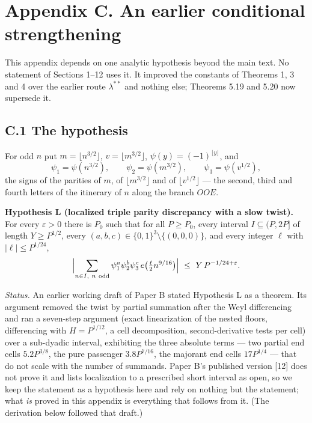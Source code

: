 \documentclass[11pt,a4paper]{article}
\begin{document}
\section{Appendix C. An earlier conditional
strengthening}\label{appendix-c.-an-earlier-conditional-strengthening}

This appendix depends on one analytic hypothesis beyond the main text.
No statement of Sections 1--12 uses it. It improved the constants of
Theorems 1, 3 and 4 over the earlier route \(\lambda^{**}\) and nothing
else; Theorems 5.19 and 5.20 now supersede it.

\subsection{C.1 The hypothesis}\label{c.1-the-hypothesis}

For odd \(n\) put \(m=\lfloor n^{3/2}\rfloor\),
\(v=\lfloor m^{3/2}\rfloor\), \(\psi(y)=(-1)^{\lfloor y\rfloor}\), and
\[
\psi_1=\psi(n^{3/2}),\qquad\psi_2=\psi(m^{3/2}),\qquad\psi_3=\psi(v^{1/2}),
\] the signs of the parities of \(m\), of \(\lfloor m^{3/2}\rfloor\) and
of \(\lfloor v^{1/2}\rfloor\) --- the second, third and fourth letters
of the itinerary of \(n\) along the branch \(OOE\).

\textbf{Hypothesis L (localized triple parity discrepancy with a slow
twist).} For every \(\varepsilon>0\) there is \(P_0\) such that for all
\(P\ge P_0\), every interval \(I\subseteq(P,2P]\) of length
\(Y\ge P^{1/2}\), every \((a,b,c)\in\{0,1\}^3\setminus\{(0,0,0)\}\), and
every integer \(\ell\) with \(|\ell|\le P^{1/24}\), \[
\Bigl|\sum_{n\in I,\ n\ \mathrm{odd}}\psi_1^{a}\psi_2^{b}\psi_3^{c}\,e\bigl(\tfrac{\ell}{2}n^{9/16}\bigr)\Bigr|
\ \le\ Y\,P^{-1/24+\varepsilon}.
\]

\emph{Status.} An earlier working draft of Paper B stated Hypothesis L
as a theorem. Its argument removed the twist by partial summation after
the Weyl differencing and ran a seven-step argument (exact linearization
of the nested floors, differencing with \(H=P^{1/12}\), a cell
decomposition, second-derivative tests per cell) over a sub-dyadic
interval, exhibiting the three absolute terms --- two partial end cells
\(5.2P^{3/8}\), the pure passenger \(3.8P^{7/16}\), the majorant end
cells \(17P^{1/4}\) --- that do not scale with the number of summands.
Paper B's published version {[}12{]} does not prove it and lists
localization to a prescribed short interval as open, so we keep the
statement as a hypothesis here and rely on nothing but the statement;
what \emph{is} proved in this appendix is everything that follows from
it. (The derivation below followed that draft.)
\end{document}
